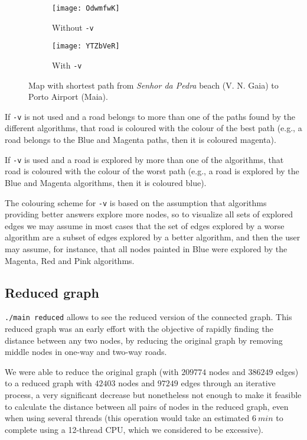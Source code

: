 \begin{figure}[h]
    \centering
    \begin{subfigure}{.49\textwidth}
        \centering
        \texttt{[image: OdwmfwK]}
        \caption{Without \texttt{-v}}
    \end{subfigure}
    \begin{subfigure}{.49\textwidth}
        \centering
        \texttt{[image: YTZbVeR]}
        \caption{With \texttt{-v}}
    \end{subfigure}
    \caption{Map with shortest path from \textit{Senhor da Pedra} beach (V. N. Gaia) to Porto Airport (Maia).}
\end{figure}

If \texttt{-v} is not used and a road belongs to more than one of the paths found by the different algorithms, that road is coloured with the colour of the best path (e.g., a road belongs to the Blue and Magenta paths, then it is coloured magenta).\par
If \texttt{-v} is used and a road is explored by more than one of the algorithms, that road is coloured with the colour of the worst path (e.g., a road is explored by the Blue and Magenta algorithms, then it is coloured blue).\par
The colouring scheme for \texttt{-v} is based on the assumption that algorithms providing better answers explore more nodes, so to visualize all sets of explored edges we may assume in most cases that the set of edges explored by a worse algorithm are a subset of edges explored by a better algorithm, and then the user may assume, for instance, that all nodes painted in Blue were explored by the Magenta, Red and Pink algorithms.

\subsection{Reduced graph}
\texttt{./main reduced} allows to see the reduced version of the connected graph. This reduced graph was an early effort with the objective of rapidly finding the distance between any two nodes, by reducing the original graph by removing middle nodes in one-way and two-way roads.\par
We were able to reduce the original graph (with $209774$ nodes and $386249$ edges) to a reduced graph with $42403$ nodes and $97249$ edges through an iterative process, a very significant decrease but nonetheless not enough to make it feasible to calculate the distance between all pairs of nodes in the reduced graph, even when using several threads (this operation would take an estimated $\SI{6}{min}$ to complete using a 12-thread CPU, which we considered to be excessive).

